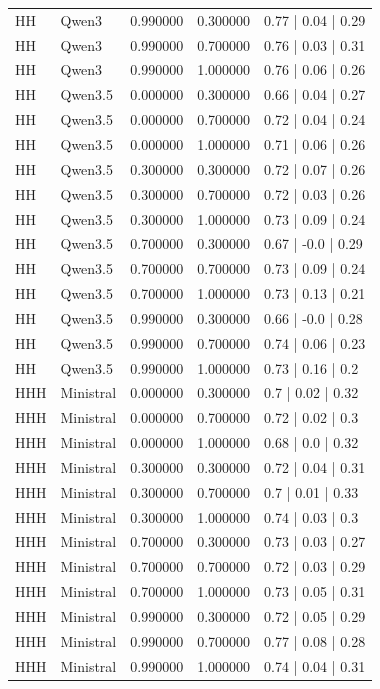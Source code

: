 \begin{longtable}{lllll}
HH & Qwen3 & 0.990000 & 0.300000 & 0.77 | 0.04 | 0.29 \\
HH & Qwen3 & 0.990000 & 0.700000 & 0.76 | 0.03 | 0.31 \\
HH & Qwen3 & 0.990000 & 1.000000 & 0.76 | 0.06 | 0.26 \\
HH & Qwen3.5 & 0.000000 & 0.300000 & 0.66 | 0.04 | 0.27 \\
HH & Qwen3.5 & 0.000000 & 0.700000 & 0.72 | 0.04 | 0.24 \\
HH & Qwen3.5 & 0.000000 & 1.000000 & 0.71 | 0.06 | 0.26 \\
HH & Qwen3.5 & 0.300000 & 0.300000 & 0.72 | 0.07 | 0.26 \\
HH & Qwen3.5 & 0.300000 & 0.700000 & 0.72 | 0.03 | 0.26 \\
HH & Qwen3.5 & 0.300000 & 1.000000 & 0.73 | 0.09 | 0.24 \\
HH & Qwen3.5 & 0.700000 & 0.300000 & 0.67 | -0.0 | 0.29 \\
HH & Qwen3.5 & 0.700000 & 0.700000 & 0.73 | 0.09 | 0.24 \\
HH & Qwen3.5 & 0.700000 & 1.000000 & 0.73 | 0.13 | 0.21 \\
HH & Qwen3.5 & 0.990000 & 0.300000 & 0.66 | -0.0 | 0.28 \\
HH & Qwen3.5 & 0.990000 & 0.700000 & 0.74 | 0.06 | 0.23 \\
HH & Qwen3.5 & 0.990000 & 1.000000 & 0.73 | 0.16 | 0.2 \\
HHH & Ministral & 0.000000 & 0.300000 & 0.7 | 0.02 | 0.32 \\
HHH & Ministral & 0.000000 & 0.700000 & 0.72 | 0.02 | 0.3 \\
HHH & Ministral & 0.000000 & 1.000000 & 0.68 | 0.0 | 0.32 \\
HHH & Ministral & 0.300000 & 0.300000 & 0.72 | 0.04 | 0.31 \\
HHH & Ministral & 0.300000 & 0.700000 & 0.7 | 0.01 | 0.33 \\
HHH & Ministral & 0.300000 & 1.000000 & 0.74 | 0.03 | 0.3 \\
HHH & Ministral & 0.700000 & 0.300000 & 0.73 | 0.03 | 0.27 \\
HHH & Ministral & 0.700000 & 0.700000 & 0.72 | 0.03 | 0.29 \\
HHH & Ministral & 0.700000 & 1.000000 & 0.73 | 0.05 | 0.31 \\
HHH & Ministral & 0.990000 & 0.300000 & 0.72 | 0.05 | 0.29 \\
HHH & Ministral & 0.990000 & 0.700000 & 0.77 | 0.08 | 0.28 \\
HHH & Ministral & 0.990000 & 1.000000 & 0.74 | 0.04 | 0.31 \\

\end{longtable}
